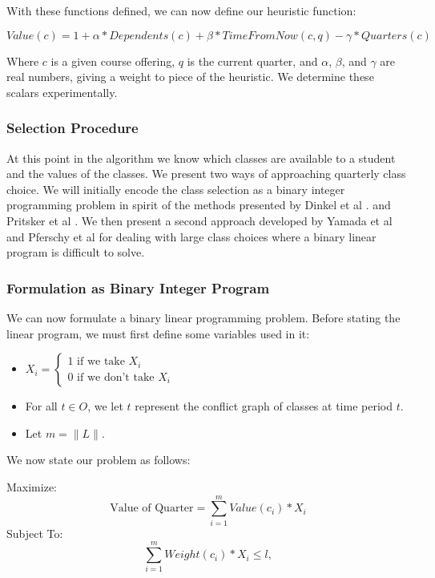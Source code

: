 \documentclass[11pt]{article} %
\begin{document}
With these functions defined, we can now define our heuristic function:

\begin{equation} 
    Value(c) = 1 + \alpha * Dependents(c) + \beta * TimeFromNow(c,q) 
    - \gamma * Quarters(c)
    \label{value_func}
\end{equation} 

Where $c$ is a given course offering, $q$ is the current quarter, and $\alpha$,
$\beta$, and $\gamma$ are real numbers, giving a weight to piece of the
heuristic.  We determine these scalars experimentally.

\subsubsection{Selection Procedure} At this point in the algorithm we know which
classes are available to a student and the values of the classes.  We present two
ways of approaching quarterly class choice.  We will initially encode the class
selection as a binary integer programming problem in spirit of the methods
presented by Dinkel et al \cite{dinkel:scheduling}. and Pritsker et al
\cite{prisker:informs}.  We then present a second approach developed by Yamada et al
\cite{yamada:heuristic} and Pferschy et al \cite{pferschy:kcg} for
dealing with large class choices where a binary linear program is difficult to solve.

\subsubsection{Formulation as Binary Integer Program} We can now formulate
a binary linear programming problem.  Before stating the linear
program, we must first define some variables used in it: 

\begin{itemize}
    \item $ X_i = \left\{ \begin{array}{lr} 1 \text{ if we take } X_i\\ 0 \text{ if
we don't take } X_i \end{array} \right.  $ 
    \item For all $t \in O$, we let $t$ represent the conflict graph of classes
    at time period $t$.
    \item Let $m = \|L\|$.  
\end{itemize} 
We now state our problem as follows: 

Maximize: 
\begin{equation}
    \text{Value of Quarter} = \sum_{i=1}^m Value(c_i) * X_i
    \label{qtrval}
\end{equation}
Subject To:
\begin{equation}
    \sum_{i=1}^m Weight(c_i) * X_i \leq l, 
    \label{weightlim}
\end{equation}
\end{document}
